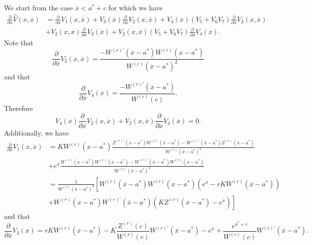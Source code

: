 \documentclass[10pt]{amsart}
\begin{document}
		We start from the case $\overline{x} < a^*+c$ for which we have
		\begin{align*}
			\frac{\partial}{\partial \overline{x}} \hat{V}(x, \overline{x}) &= \frac{\partial}{\partial \overline{x}} V_1(x, \overline{x}) + V_3(\overline{x})\frac{\partial}{\partial \overline{x}} V_2(x, \overline{x}) + V_4(\overline{x})( V_5 + V_6 V_7 ) \frac{\partial}{\partial \overline{x}} V_2(x, \overline{x}) \\
			\nonumber &+ V_2(x,\overline{x}) \frac{\partial}{\partial \overline{x}} V_3(\overline{x})+ V_2(x, \overline{x})( V_5 + V_6 V_7 )\frac{\partial}{\partial \overline{x}} V_4(\overline{x}).
		\end{align*}
		Note that		
		\begin{equation*}
			\frac{\partial}{\partial \overline{x}} V_2(x, \overline{x}) = \frac{-W^{(r)'}(\overline{x}-a^*)W^{(r)}(x-a^*)}{W^{(r)}(\overline{x}-a^*)^2}
		\end{equation*}		
		and that		
		\begin{equation*}
			\frac{\partial}{\partial \overline{x}} V_4(\overline{x}) = \frac{-W^{(r)'}(\overline{x}-a^*)}{W^{(r)}(c)}.
		\end{equation*}				
		Therefore
		\begin{equation*}
			V_4(\overline{x})\frac{\partial}{\partial \overline{x}} V_2(x, \overline{x}) +  V_2(x, \overline{x})\frac{\partial}{\partial \overline{x}} V_4(\overline{x}) = 0.
		\end{equation*}
		Additionally, we have
		\begin{align*}
			\frac{\partial}{\partial \overline{x}} V_1(x, \overline{x}) &=	K W^{(r)}(x-a^*) \frac{Z^{(r)'}(\overline{x}-a^*)W^{(r)}(\overline{x}-a^*)-W^{(r)'}(\overline{x}-a^*)Z^{(r)}(\overline{x}-a^*)}{W^{(r)}(\overline{x}-a^*)^2} \\
			\nonumber &+ e^{\overline{x}} \frac{W^{(r)}(x-a^*)W^{(r)}(\overline{x}-a^*) - W^{(r)'}(\overline{x}-a^*)W^{(r)}(x-a^*)}{W^{(r)}(\overline{x}-a^*)^2} \\
			\nonumber &= \frac{1}{W^{(r)}(\overline{x}-a^*)^2} \left[ W^{(r)}(\overline{x}-a^*)W^{(r)}(x-a^*)\left( e^{\overline{x}} - rKW^{(r)}(\overline{x}-a^*) \right) \right. \\
			\nonumber & \left. + W^{(r)}(x-a^*)W^{(r)'}(\overline{x}-a^*) \left( KZ^{(r)}(\overline{x}-a^*) - e^{\overline{x}} \right) \right]
		\end{align*}		
		and that
		\begin{equation*}
			\frac{\partial}{\partial \overline{x}} V_3(\overline{x}) = rK W^{(r)}(\overline{x}-a^*) - K\frac{Z^{(r)}(c)}{W^{(r)}(c)}W^{(r)'}(\overline{x}-a^*)  - e^{\overline{x}} + \frac{e^{a^*+c}}{W^{(r)}(c)}W^{(r)'}(\overline{x}-a^*).
		\end{equation*}	
\end{document}
